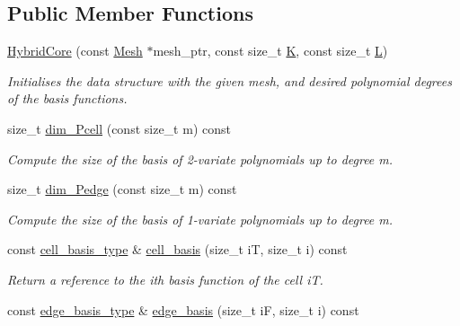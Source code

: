 \subsection*{Public Member Functions}
\begin{DoxyCompactItemize}
\item 
\hyperlink{classHArDCore2D_1_1HybridCore_ae189b44b4574688e4ae5c59d853317ab}{Hybrid\+Core} (const \hyperlink{classHArDCore2D_1_1Mesh}{Mesh} $\ast$mesh\+\_\+ptr, const size\+\_\+t \hyperlink{classHArDCore2D_1_1HybridCore_a74242d0a8b68fe5d9a35c6eb0effe3b2}{K}, const size\+\_\+t \hyperlink{classHArDCore2D_1_1HybridCore_af5aea2e23e91c582d8c8189a5bc7ae96}{L})
\begin{DoxyCompactList}\small\item\em Initialises the data structure with the given mesh, and desired polynomial degrees of the basis functions. \end{DoxyCompactList}\item 
size\+\_\+t \hyperlink{classHArDCore2D_1_1HybridCore_aa2bdc59d150566e1b992058031509d2f}{dim\+\_\+\+Pcell} (const size\+\_\+t m) const
\begin{DoxyCompactList}\small\item\em Compute the size of the basis of 2-\/variate polynomials up to degree m. \end{DoxyCompactList}\item 
size\+\_\+t \hyperlink{classHArDCore2D_1_1HybridCore_ab0fb57313f27fb8b4a6e9747de1d5cfe}{dim\+\_\+\+Pedge} (const size\+\_\+t m) const
\begin{DoxyCompactList}\small\item\em Compute the size of the basis of 1-\/variate polynomials up to degree m. \end{DoxyCompactList}\item 
const \hyperlink{classHArDCore2D_1_1HybridCore_a4b9c53f6ec13dc9e73f5cdc5c8ae782b}{cell\+\_\+basis\+\_\+type} \& \hyperlink{classHArDCore2D_1_1HybridCore_a34242db07cc2b3c3b867d9e4580b634d}{cell\+\_\+basis} (size\+\_\+t iT, size\+\_\+t i) const
\begin{DoxyCompactList}\small\item\em Return a reference to the i\textquotesingle{}th basis function of the cell iT. \end{DoxyCompactList}\item 
const \hyperlink{classHArDCore2D_1_1HybridCore_a1f2030ea16722179fd3523e6e6675948}{edge\+\_\+basis\+\_\+type} \& \hyperlink{classHArDCore2D_1_1HybridCore_a6b4feaeef7739a2e30fcf6c601fcf721}{edge\+\_\+basis} (size\+\_\+t iF, size\+\_\+t i) const

\end{DoxyCompactItemize}
